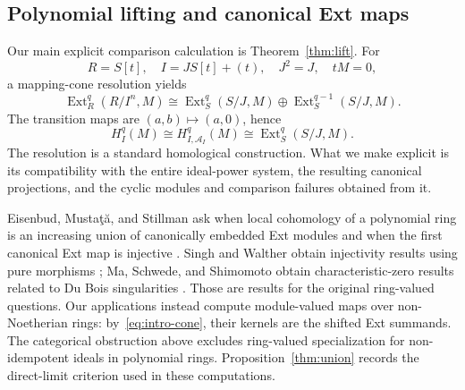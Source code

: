 \documentclass[11pt,reqno]{amsart}
\theoremstyle{definition}
\theoremstyle{remark}
\newcommand{\Ext}{\operatorname{Ext}}
\newcommand{\A}{\mathcal A_I}
\begin{document}
\subsection{Polynomial lifting and canonical Ext maps}
Our main explicit comparison calculation is Theorem~\ref{thm:lift}. For
\[
R=S[t],\quad I=JS[t]+(t),\quad J^2=J,\quad tM=0,
\]
a mapping-cone resolution yields
\begin{equation}\label{eq:intro-cone}
\Ext_R^q(R/I^n,M)\cong
\Ext_S^q(S/J,M)\oplus\Ext_S^{q-1}(S/J,M).
\end{equation}
The transition maps are $(a,b)\mapsto(a,0)$, hence
\[
H_I^q(M)\cong H_{I,\A}^q(M)\cong\Ext_S^q(S/J,M).
\]
The resolution is a standard homological construction. What we make explicit is its compatibility with the entire ideal-power system, the resulting canonical projections, and the cyclic modules and comparison failures obtained from it.

Eisenbud, Musta\c{t}\u{a}, and Stillman ask when local cohomology of a polynomial ring is an increasing union of canonically embedded Ext modules and when the first canonical Ext map is injective \cite{EisenbudMustataStillman2000}. Singh and Walther obtain injectivity results using pure morphisms \cite{SinghWalther2007}; Ma, Schwede, and Shimomoto obtain characteristic-zero results related to Du Bois singularities \cite{MaSchwedeShimomoto2017}. Those are results for the original ring-valued questions. Our applications instead compute module-valued maps over non-Noetherian rings: by~\eqref{eq:intro-cone}, their kernels are the shifted Ext summands. The categorical obstruction above excludes ring-valued specialization for non-idempotent ideals in polynomial rings. Proposition~\ref{thm:union} records the direct-limit criterion used in these computations.
\end{document}
